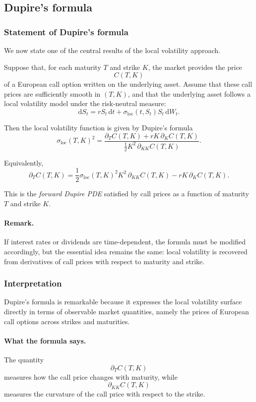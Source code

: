 \documentclass[11pt]{article}
\theoremstyle{plain}
\theoremstyle{definition}
\theoremstyle{remark}
\begin{document}
\subsection{Dupire's formula}

\subsubsection{Statement of Dupire's formula}

We now state one of the central results of the local volatility
approach.

Suppose that, for each maturity \(T\) and strike \(K\), the market
provides the price
\[
C(T,K)
\]
of a European call option written on the underlying asset.
Assume that these call prices are sufficiently smooth in \((T,K)\), and
that the underlying asset follows a local volatility model under the
risk-neutral measure:
\[
\mathrm{d}S_t
=
rS_t\,\mathrm{d}t
+
\sigma_{\mathrm{loc}}(t,S_t)S_t\,\mathrm{d}W_t.
\]

Then the local volatility function is given by Dupire's formula
\[
\boxed{
\sigma_{\mathrm{loc}}(T,K)^2
=
\frac{
\partial_T C(T,K)+rK\,\partial_K C(T,K)
}{
\frac12 K^2\,\partial_{KK}C(T,K)
}.
}
\]

Equivalently,
\[
\boxed{
\partial_T C(T,K)
=
\frac12 \sigma_{\mathrm{loc}}(T,K)^2 K^2\,\partial_{KK}C(T,K)
-rK\,\partial_K C(T,K).
}
\]

This is the \emph{forward Dupire PDE} satisfied by call prices as a
function of maturity \(T\) and strike \(K\).

\paragraph{Remark.}
If interest rates or dividends are time-dependent, the formula must be
modified accordingly, but the essential idea remains the same:
local volatility is recovered from derivatives of call prices with
respect to maturity and strike.

\subsubsection{Interpretation}

Dupire's formula is remarkable because it expresses the local volatility
surface directly in terms of observable market quantities, namely the
prices of European call options across strikes and maturities.

\paragraph{What the formula says.}
The quantity
\[
\partial_T C(T,K)
\]
measures how the call price changes with maturity, while
\[
\partial_{KK}C(T,K)
\]
measures the curvature of the call price with respect to the strike.
\end{document}
